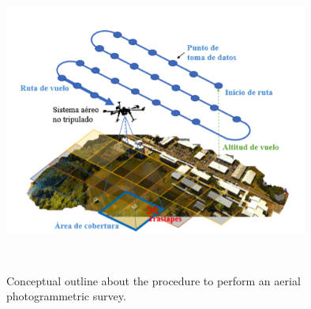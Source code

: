 \begin{figure}[H]
\centering
\includegraphics[width=10cm,height=10cm,keepaspectratio]{imagenes/Photogram.png}
\caption{Conceptual outline about the procedure to perform an aerial photogrammetric survey\cite{pulicacion}.}
\label{fig:photogrametry}
\end{figure}